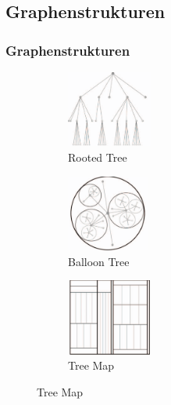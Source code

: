 \documentclass[11pt]{beamer}
\begin{document}
\subsection{Graphenstrukturen}
\begin{frame}
\frametitle{Graphenstrukturen}

\begin{figure}[c]
 
\begin{subfigure}{0.25\linewidth}
\includegraphics[width=\linewidth, height=2.5cm]{./HierachicalTree.png} 
\caption{Rooted Tree}

\end{subfigure}
 \begin{subfigure}{0.25\linewidth}
\includegraphics[width=\linewidth, height=2.5cm]{./BalloonTree.png}
\caption{Balloon Tree}

\end{subfigure}
 \begin{subfigure}{0.25\linewidth}
\includegraphics[width=\linewidth, height=2.5cm]{./TreeMap.png}
\caption{Tree Map}
\end{subfigure}
\end{figure}
\end{frame}
\end{document}
